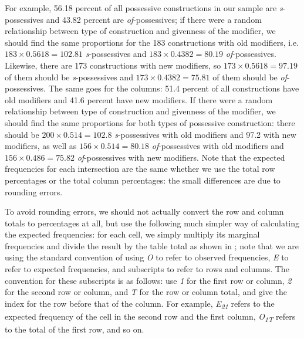 For example, 56.18 percent of all possessive  constructions in our sample are \textit{s}-possessives and 43.82 percent are \textit{of}-possessives; if there were a random relationship between type of construction and givenness  of the modifier, we should find the same proportions for the 183 constructions with old modifiers, i.e. $183 \times 0.5618 = 102.81$ \textit{s}-possessives and $183 \times 0.4382 = 80.19$ \textit{of}-possessives. Likewise, there are 173 constructions with new modifiers, so $173 \times 0.5618 = 97.19$ of them should be \textit{s}-possessives and $173 \times 0.4382 = 75.81$ of them should be \textit{of}-possessives. The same goes for the columns: 51.4 percent of all constructions have old modifiers and 41.6 percent have new modifiers. If there were a random  relationship between type of construction and givenness  of the modifier, we should find the same proportions for both types of possessive  construction: there should be $200 \times 0.514 = 102.8$ \textit{s}-possessives with old modifiers and 97.2 with new modifiers, as well as $156 \times 0.514 = 80.18$ \textit{of}-possessives with old modifiers and $156 \times 0.486 = 75.82$ \textit{of}-possessives with new modifiers. Note that the expected  frequencies for each intersection are the same whether we use the total row percentages or the total column percentages: the small differences are due to rounding errors.

To avoid rounding errors, we should not actually convert the row and column totals to percentages at all, but use the following much simpler way of calculating the expected  frequencies: for each cell, we simply multiply its marginal frequencies and divide the result by the table total as shown in ; note that we are using the standard convention of using \textit{O} to refer to observed frequencies,  \textit{E} to refer to expected frequencies, and subscripts to refer to rows and columns. The convention for these subscripts is as follows: use \textit{1} for the first row or column, \textit{2} for the second row or column, and \textit{T} for the row or column total, and give the index for the row before that of the column. For example, \textit{E}\textit{\textsubscript{21}} refers to the expected  frequency of the cell in the second row and the first column, \textit{O}\textit{\textsubscript{1T}} refers to the total of the first row, and so on.

